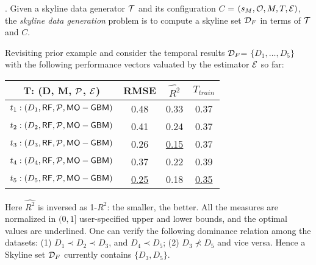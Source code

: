 . 
Given 
a skyline data generator $\T$ 
and its configuration $C$ = $(s_M, \O, M, T, \E)$, 
the {\em skyline data generation} problem 
is to 
compute a skyline set $\D_F$ 
in terms of $\T$ and $C$. 

\begin{example}
\label{exa-modis}
Revisiting prior example %
and consider 
the temporal results $\D_F$= 
$\{D_1, \ldots, D_5\}$ with the following performance 
vectors valuated by 
the estimator $\E$ so far: 

\begin{center}
\begin{small}
    \begin{tabular}{|c|c|c|c|}  
        \hline
       T: (D, M, $\P$, $\E$)  & RMSE & $\hat{R^2}$ & $T_{train}$ \\  \hline
            $t_1:(D_1,\kw{RF},\P,  \kw{MO-GBM})$ & 0.48 & 0.33 & 0.37 \\
       \hline
            $t_2:(D_2,\kw{RF},\P, \kw{MO-GBM})$ & 0.41 & 0.24 & 0.37 \\
       \hline
            $t_3:(D_3,\kw{RF},\P, \kw{MO-GBM})$ & 0.26 & \underline{0.15} & 0.37 \\
       \hline
            $t_4:(D_4,\kw{RF},\P, \kw{MO-GBM})$ & 0.37 & 0.22 & 0.39\\
       \hline
            $t_5:(D_5,\kw{RF},\P, \kw{MO-GBM})$ & \underline{0.25} & 0.18 & \underline{0.35}\\
       \hline
    \end{tabular}
    \end{small}
\end{center}
Here $\hat{R^2}$ is inversed as 1-$R^2$:  
the smaller, the better. 
All the measures are 
normalized in $(0,1]$ \wrt 
user-specified upper and lower bounds, 
and the optimal values are underlined. 
One can verify the following dominance relation among the 
datasets: 
(1) $D_1 \prec D_2 \prec D_3$, 
and $D_4 \prec D_5$;
(2) $D_3 \not\prec D_5$ and vice versa.  
Hence a Skyline set 
$\D_F$ currently
contains $\{D_3, D_5\}$. 
\end{example}

